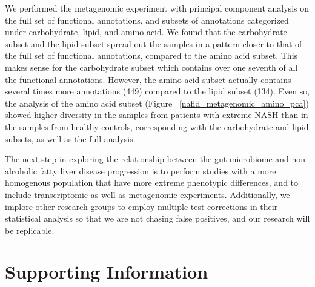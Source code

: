 We performed the metagenomic experiment with principal component analysis on the full set of functional annotations, and subsets of annotations categorized under carbohydrate, lipid, and amino acid. We found that the carbohydrate subset and the lipid subset spread out the samples in a pattern closer to that of the full set of functional annotations, compared to the amino acid subset. This makes sense for the carbohydrate subset which contains over one seventh of all the functional annotations. However, the amino acid subset actually contains several times more annotations (449) compared to the lipid subset (134). Even so, the analysis of the amino acid subset (Figure ~\ref{nafld_metagenomic_amino_pca}) showed higher diversity in the samples from patients with extreme NASH than in the samples from healthy controls, corresponding with the carbohydrate and lipid subsets, as well as the full analysis.

The next step in exploring the relationship between the gut microbiome and non alcoholic fatty liver disease progression is to perform studies with a more homogenous population that have more extreme phenotypic differences, and to include transcriptomic as well as metagenomic experiments. Additionally, we implore other research groups to employ multiple test corrections in their statistical analysis so that we are not chasing false positives, and our research will be replicable.

\section*{{Supporting Information}}

